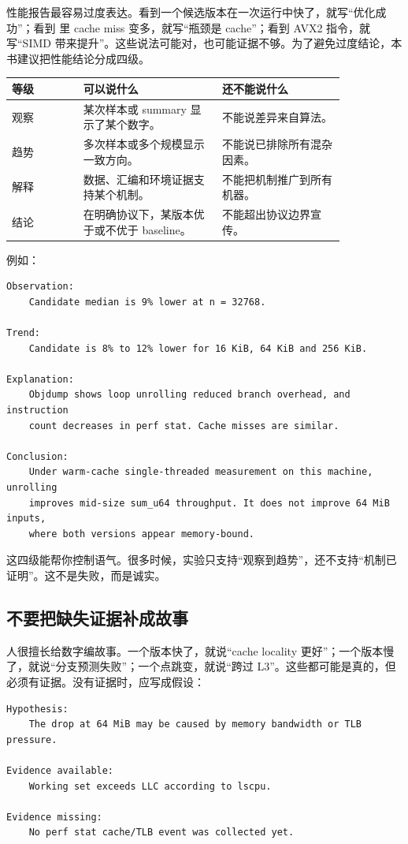性能报告最容易过度表达。看到一个候选版本在一次运行中快了，就写“优化成功”；看到  里 cache miss 变多，就写“瓶颈是 cache”；看到 AVX2 指令，就写“SIMD 带来提升”。这些说法可能对，也可能证据不够。为了避免过度结论，本书建议把性能结论分成四级。

\begin{center}
\begin{tabular}{p{0.18\linewidth}p{0.35\linewidth}p{0.31\linewidth}}
\toprule
等级 & 可以说什么 & 还不能说什么 \\
\midrule
观察 & 某次样本或 summary 显示了某个数字。 & 不能说差异来自算法。 \\
趋势 & 多次样本或多个规模显示一致方向。 & 不能说已排除所有混杂因素。 \\
解释 & 数据、汇编和环境证据支持某个机制。 & 不能把机制推广到所有机器。 \\
结论 & 在明确协议下，某版本优于或不优于 baseline。 & 不能超出协议边界宣传。 \\
\bottomrule
\end{tabular}
\end{center}

例如：

\begin{lstlisting}
Observation:
    Candidate median is 9% lower at n = 32768.

Trend:
    Candidate is 8% to 12% lower for 16 KiB, 64 KiB and 256 KiB.

Explanation:
    Objdump shows loop unrolling reduced branch overhead, and instruction
    count decreases in perf stat. Cache misses are similar.

Conclusion:
    Under warm-cache single-threaded measurement on this machine, unrolling
    improves mid-size sum_u64 throughput. It does not improve 64 MiB inputs,
    where both versions appear memory-bound.
\end{lstlisting}

这四级能帮你控制语气。很多时候，实验只支持“观察到趋势”，还不支持“机制已证明”。这不是失败，而是诚实。

\subsection{不要把缺失证据补成故事}

人很擅长给数字编故事。一个版本快了，就说“cache locality 更好”；一个版本慢了，就说“分支预测失败”；一个点跳变，就说“跨过 L3”。这些都可能是真的，但必须有证据。没有证据时，应写成假设：

\begin{lstlisting}
Hypothesis:
    The drop at 64 MiB may be caused by memory bandwidth or TLB pressure.

Evidence available:
    Working set exceeds LLC according to lscpu.

Evidence missing:
    No perf stat cache/TLB event was collected yet.
\end{lstlisting}

